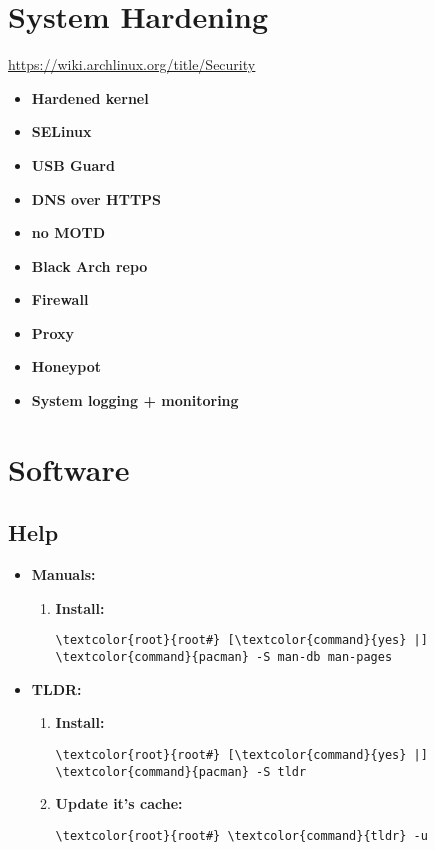 \documentclass[10pt, a4paper, onecolumn, openany]{book} %
\begin{document}
\chapter{System Hardening}
\underline{\url{https://wiki.archlinux.org/title/Security}}
\begin{itemize}
    \item \textbf{Hardened kernel}
    \item \textbf{SELinux}
    \item \textbf{USB Guard}
    \item \textbf{DNS over HTTPS}
    \item \textbf{no MOTD}
    \item \textbf{Black Arch repo}
    \item \textbf{Firewall}
    \item \textbf{Proxy}
    \item \textbf{Honeypot}
    \item \textbf{System logging + monitoring}
\end{itemize}

\chapter{Software}
\section{Help}
\begin{itemize}
    \item \textbf{Manuals:}
    \begin{enumerate}
        \item \textbf{Install:}
\begin{Verbatim}[commandchars=\\\{\}]
\textcolor{root}{root#} [\textcolor{command}{yes} |] \textcolor{command}{pacman} -S man-db man-pages
\end{Verbatim}
    \end{enumerate}

    \item \textbf{TLDR:}
    \begin{enumerate}
        \item \textbf{Install:}
\begin{Verbatim}[commandchars=\\\{\}]
\textcolor{root}{root#} [\textcolor{command}{yes} |] \textcolor{command}{pacman} -S tldr
\end{Verbatim}
        \item \textbf{Update it's cache:}
\begin{Verbatim}[commandchars=\\\{\}]
\textcolor{root}{root#} \textcolor{command}{tldr} -u
\end{Verbatim}
    \end{enumerate}

\end{itemize}
\end{document}
